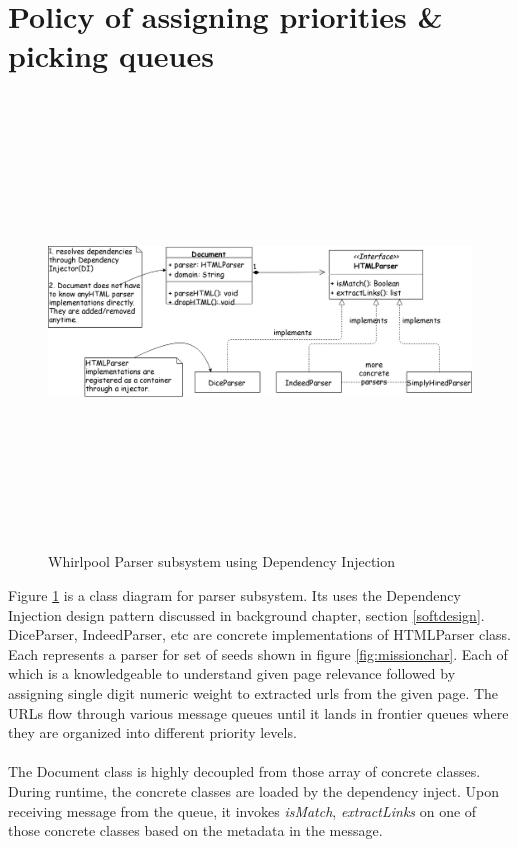 \section{Policy of assigning priorities \& picking queues}
\begin{figure}[h!]
  \centering
  \includegraphics[width=15cm,height=12cm,keepaspectratio]{../media/crawler/docparsers.png}
  \caption{Whirlpool Parser subsystem using Dependency Injection}
  \label{fig:htmlparser}
\end{figure}

\noindent
Figure \ref{fig:htmlparser} is a class diagram for parser subsystem. Its uses the Dependency Injection
design pattern discussed in background chapter, section \ref{softdesign}. DiceParser, IndeedParser, etc are
concrete implementations of HTMLParser class. Each represents a parser for set of seeds shown in figure
\ref{fig:missionchar}. Each of which is a knowledgeable to understand given page relevance followed by assigning single digit numeric weight to extracted urls from the given page. The URLs flow through various message queues until it lands in frontier queues where they are organized into different priority levels. 
\\
\\
\noindent
The Document class is highly decoupled from those array of concrete classes. During runtime, the
concrete classes are loaded by the dependency inject. Upon receiving message from the queue, it invokes
\textit{isMatch}, \textit{extractLinks} on one of those concrete classes based on the metadata in the
message.

\pagebreak



